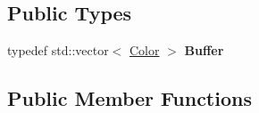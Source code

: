 \subsection*{Public Types}
\begin{DoxyCompactItemize}
\item 
\mbox{\label{classprzurro_1_1_color___buffer___rgba8888_afa5a50943dcfb6f09c0e4db736757cfc}} 
typedef std\+::vector$<$ \mbox{\hyperlink{structprzurro_1_1_color___buffer___rgba8888_1_1_color}{Color}} $>$ {\bfseries Buffer}
\end{DoxyCompactItemize}
\subsection*{Public Member Functions}
